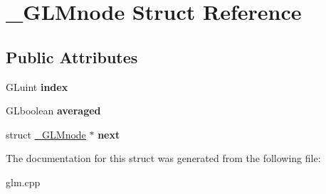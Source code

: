 \hypertarget{struct__GLMnode}{\section{\-\_\-\-G\-L\-Mnode \-Struct \-Reference}
\label{struct__GLMnode}
}
\subsection*{\-Public \-Attributes}
\begin{DoxyCompactItemize}
\item 
\hypertarget{struct__GLMnode_a623dff51dc67366e5fa2e3b27a12eb5a}{\-G\-Luint {\bfseries index}}\label{struct__GLMnode_a623dff51dc67366e5fa2e3b27a12eb5a}

\item 
\hypertarget{struct__GLMnode_a24056262ae27d98869a9ddb9aee71f26}{\-G\-Lboolean {\bfseries averaged}}\label{struct__GLMnode_a24056262ae27d98869a9ddb9aee71f26}

\item 
\hypertarget{struct__GLMnode_a425191d3e6f9827ebd213b5f289990ae}{struct \hyperlink{struct__GLMnode}{\-\_\-\-G\-L\-Mnode} $\ast$ {\bfseries next}}\label{struct__GLMnode_a425191d3e6f9827ebd213b5f289990ae}

\end{DoxyCompactItemize}


\-The documentation for this struct was generated from the following file\-:\begin{DoxyCompactItemize}
\item 
glm.\-cpp\end{DoxyCompactItemize}
